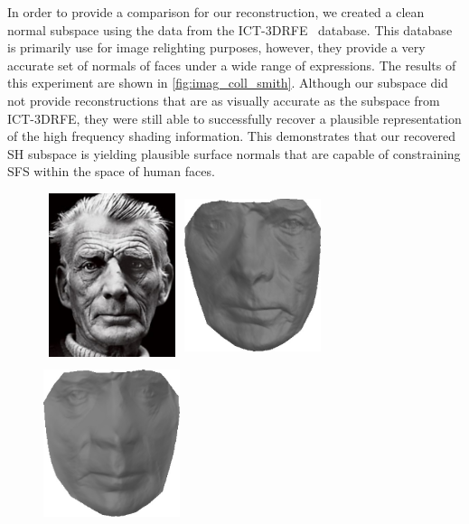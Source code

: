 In order to provide a comparison for our reconstruction, we created a clean
normal subspace using the data from the ICT-3DRFE~\cite{stratou2012exploring}
database. This database is primarily use for image relighting purposes, however,
they provide a very accurate set of normals of faces under a wide range of
expressions. The results of this experiment are shown in \cref{fig:imag_coll_smith}.
Although our subspace did not provide reconstructions that are as visually
accurate as the subspace from ICT-3DRFE, they were still able to successfully
recover a plausible representation of the high frequency shading information.
This demonstrates that our recovered SH subspace is yielding plausible surface
normals that are capable of constraining SFS within the space of human faces.
\begin{figure}[t]
    \centering
    \includegraphics[width=4cm,height=4.8cm]{collection_ps/images/smith/samuel_beckett}                    \hspace{0.3cm}
    \includegraphics[width=4cm,height=4.8cm]{collection_ps/images/smith/beckett_smith_frontal_ict}         \hspace{0.3cm}
    \includegraphics[width=4cm,height=4.8cm]{collection_ps/images/smith/beckett_smith_frontal_low_rank}    \\

\end{figure}
